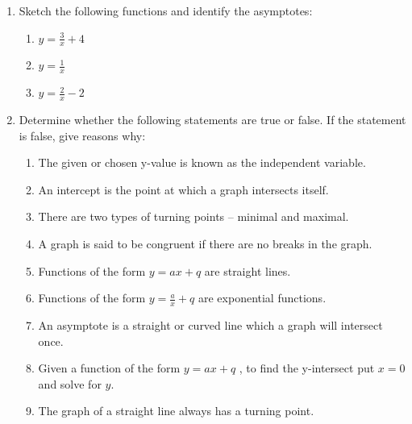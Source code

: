 \begin{enumerate}[noitemsep, label=\textbf{\arabic*}. ]
        \label{m39348*uid408}\item Sketch the following functions and identify the asymptotes: 
\label{m39348*id254515}\begin{enumerate}[noitemsep, label=\textbf{\alph*}. ] 
            \item 
\begin{math}y=\frac{3}{x}+4\end{math} \item 
\begin{math}y=\frac{1}{x}\end{math} \item 
\begin{math}y=\frac{2}{x}-2\end{math} \end{enumerate}
        
        \label{m39348*uid409}\item Determine whether the following statements are true or false. If the statement is false, give reasons why:
\label{m39348*id254516}\begin{enumerate}[noitemsep, label=\textbf{\alph*}. ] 
            \item The given or chosen y-value is known as the independent variable.\item An intercept is the point at which a graph intersects itself.\item There are two types of turning points -- minimal and maximal.\item A graph is said to be congruent if there are no breaks in the graph.\item Functions of the form \begin{math}y=ax+q\end{math} are straight lines.\item Functions of the form \begin{math}y=\frac{a}{x}+q\end{math} are exponential functions.\item  An asymptote is a straight or curved line which a graph will intersect once.\item Given a function of the form \begin{math}y=ax+q\end{math} , to find the y-intersect put \begin{math}x=0\end{math} and solve for \begin{math}y\end{math}.\item The graph of a straight line always has a turning point.\end{enumerate}
        

\end{enumerate}
